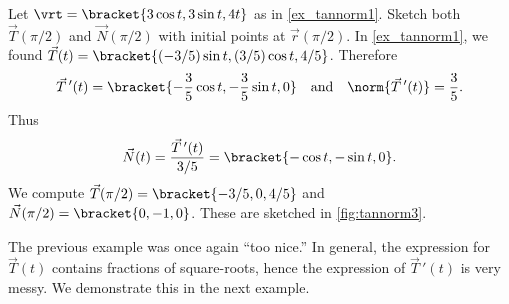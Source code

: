 \begin{example}\label{ex_tannorm3}
Let $\vrt =\bracket{3\cos t, 3\sin t, 4t}$ as in \autoref{ex_tannorm1}. Sketch both $\vec T(\pi/2)$ and $\vec N(\pi/2)$ with initial points at $\vec r(\pi/2)$.
\solution
In \autoref{ex_tannorm1}, we found $\vec T(t) =\bracket{(-3/5)\sin t,(3/5)\cos t,4/5}$. Therefore 
\[\vec T\,'(t) =\bracket{-\frac35\cos t,-\frac35\sin t,0}\quad \text{and} \quad \norm{\vec T\,'(t)} = \frac35.\]
Thus
\[\vec N(t) = \frac{\vec T\,'(t)}{3/5} =\bracket{-\cos t,-\sin t,0}.\]
We compute $\vec T(\pi/2) =\bracket{-3/5,0,4/5}$ and $\vec N(\pi/2) =\bracket{0,-1,0}$. These are sketched in \autoref{fig:tannorm3}.
\end{example}

The previous example was once again ``too nice.'' In general, the expression for $\vec T(t)$ contains fractions of square-roots, hence the expression of $\vec T\,'(t)$ is very messy. We demonstrate this in the next example.


